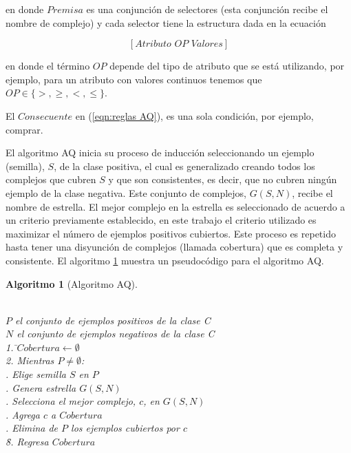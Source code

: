 \documentclass[12pt]{scrbook}
\theoremstyle{break}
\theoremstyle{break}
\newtheorem{algoritmo}{Algoritmo}[chapter]
\begin{document}
en donde $Premisa$ es una conjunción de selectores (esta conjunción recibe el nombre de complejo) y cada selector tiene la estructura dada en la ecuación 

\begin{equation} \label{eqn:condicion AQ}
\left[Atributo\,\, OP\,\, Valores \right]
\end{equation}

en donde el término $OP$ depende del tipo de atributo que se está utilizando, por ejemplo, para un atributo con valores continuos tenemos que $OP \in \{>, \geq, <, \leq\}$.

El $Consecuente$ en (\ref{eqn:reglas AQ}), es una sola condición, por ejemplo, comprar.

El algoritmo AQ inicia su proceso de inducción seleccionando un ejemplo (semilla), $S$, de la clase positiva, el cual es generalizado creando todos los complejos que cubren $S$ y que son consistentes, es decir, que no cubren ningún ejemplo de la clase negativa. Este conjunto de complejos, $G(S,N)$, recibe el nombre de estrella. El mejor complejo en la estrella es seleccionado de acuerdo a un criterio previamente establecido, en este trabajo el criterio utilizado es maximizar el número de ejemplos positivos cubiertos. Este proceso es repetido hasta tener una disyunción de complejos (llamada cobertura) que es completa y consistente. El algoritmo \ref{algo:AQ} muestra un pseudocódigo para el algoritmo AQ.

\begin{algoritmo}[Algoritmo AQ]
\begin{tabbing}
\\$P$ el conjunto de ejemplos positivos de la clase C
\\$N$ el conjunto de ejemplos negativos de la clase C\\
1. \=$Cobertura\leftarrow \emptyset $ \\
2. Mientras $P \neq \emptyset$:\\
 . Elige semilla $S$ en $P$\\
 . Genera estrella $G(S,N)$\\
 . Selecciona el mejor complejo, $c$, en $G(S,N)$\\
 . Agrega $c$ a $Cobertura$\\
 . Elimina de $P$ los ejemplos cubiertos por $c$\\
\=8. Regresa $Cobertura$
\end{tabbing}
\label{algo:AQ}
\end{algoritmo}
\end{document}
